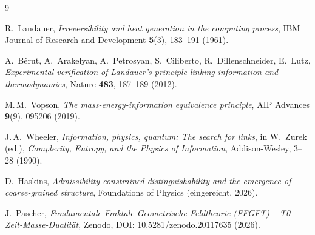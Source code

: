 \begin{thebibliography}{9}

R.~Landauer,
\textit{Irreversibility and heat generation in the computing process},
IBM Journal of Research and Development \textbf{5}(3), 183--191 (1961).

A.~Bérut, A.~Arakelyan, A.~Petrosyan, S.~Ciliberto,
R.~Dillenschneider, E.~Lutz,
\textit{Experimental verification of Landauer's principle linking
information and thermodynamics},
Nature \textbf{483}, 187--189 (2012).

M.\,M.~Vopson,
\textit{The mass-energy-information equivalence principle},
AIP Advances \textbf{9}(9), 095206 (2019).

J.\,A.~Wheeler,
\textit{Information, physics, quantum: The search for links},
in W.~Zurek (ed.), \textit{Complexity, Entropy, and the Physics
of Information}, Addison-Wesley, 3--28 (1990).

D.~Haskins,
\textit{Admissibility-constrained distinguishability and the emergence
of coarse-grained structure},
Foundations of Physics (eingereicht, 2026).

J.~Pascher,
\textit{Fundamentale Fraktale Geometrische Feldtheorie (FFGFT) --
T0-Zeit-Masse-Dualität},
Zenodo, DOI: 10.5281/zenodo.20117635 (2026).

\end{thebibliography}
